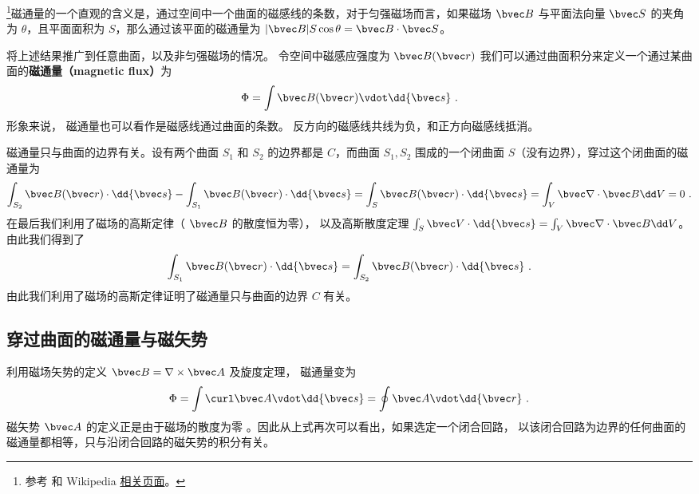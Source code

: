 
\begin{issues}
\issueDraft
{}
\end{issues}


\footnote{参考 \cite{GriffE} 和 Wikipedia \href{https://en.wikipedia.org/wiki/Magnetic_flux}{相关页面}。}磁通量的一个直观的含义是，通过空间中一个曲面的磁感线的条数，对于匀强磁场而言，如果磁场 $\bvec B$ 与平面法向量 $\bvec S$ 的夹角为 $\theta$，且平面面积为 $S$，那么通过该平面的磁通量为 $|\bvec B|S \cos\theta = \bvec B\cdot \bvec S$。

将上述结果推广到任意曲面，以及非匀强磁场的情况。
令空间中磁感应强度为 $\bvec B(\bvec r)$ 我们可以通过曲面积分来定义一个通过某曲面的\textbf{磁通量（magnetic flux）}为
\begin{equation}
\Phi  = \int \bvec B(\bvec r) \vdot \dd{\bvec s}~.
\end{equation}
形象来说， 磁通量也可以看作是磁感线通过曲面的条数。 反方向的磁感线共线为负，和正方向磁感线抵消。

磁通量只与曲面的边界有关。设有两个曲面 $S_1$ 和 $S_2$ 的边界都是 $C$，而曲面 $S_1,S_2$ 围成的一个闭曲面 $S$（没有边界），穿过这个闭曲面的磁通量为
\begin{equation}
\int_{S_2} \bvec B(\bvec r)\cdot \dd {\bvec s }- \int_{S_1} \bvec B(\bvec r)\cdot \dd {\bvec s} = \int_{S} \bvec B(\bvec r)\cdot \dd {\bvec s}=\int_V \bvec \nabla \cdot \bvec B \dd V=0~.
\end{equation}
在最后我们利用了磁场的高斯定律（ $\bvec B$ 的散度恒为零）， 以及高斯散度定理 $\int_S \bvec V\cdot \dd{\bvec s}=\int_V \bvec \nabla\cdot \bvec B \dd V$。由此我们得到了
\begin{equation}
\int_{S_1} \bvec B(\bvec r)\cdot \dd {\bvec s}
=
\int_{S_2} \bvec B(\bvec r)\cdot \dd {\bvec s }~.
\end{equation}
由此我们利用了磁场的高斯定律证明了磁通量只与曲面的边界 $C$ 有关。
\subsection{穿过曲面的磁通量与磁矢势}
利用磁场矢势的定义 $\bvec B=\nabla\times \bvec A$ %
及旋度定理， %
磁通量变为
\begin{equation} \label{eq_BFlux_2}
\Phi  = \int \curl \bvec A \vdot \dd{\bvec s}  = \oint \bvec A \vdot \dd{\bvec r}~.
\end{equation}
磁矢势 $\bvec A$ 的定义正是由于磁场的散度为零%
。因此从上式再次可以看出，如果选定一个闭合回路， 以该闭合回路为边界的任何曲面的磁通量都相等，只与沿闭合回路的磁矢势的积分有关。
